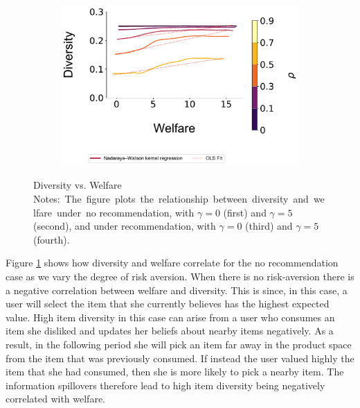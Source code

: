 \documentclass[sigconf]{acmart}
\begin{document}
\begin{figure}[t]
{\begin{minipage}{1.2\textwidth}
\begin{subfigure}{.22\textwidth}
\end{subfigure}
\begin{subfigure}{.22\textwidth}
\includegraphics[width=1.0\linewidth]{figures/diversity_welfare_ra_partial_n_200.pdf}
\end{subfigure}
\end{minipage}}
\caption{Diversity vs. Welfare\hfill\break
\scriptsize{Notes:~The~figure~plots~the~relationship~between~diversity~and~welfare~under~no recommendation, with $\gamma = 0$ (first) and $\gamma = 5$ (second), and under recommendation, with $\gamma = 0$ (third) and $\gamma = 5$ (fourth).}}\label{fig:diversity_welfare_ra}
\end{figure}

Figure \ref{fig:diversity_welfare_ra} shows how diversity and welfare correlate for the no recommendation case as we vary the degree of risk aversion. When there is no risk-aversion there is a negative correlation between welfare and diversity. This is since, in this case, a user will select the item that she currently believes has the highest expected value. High item diversity in this case can arise from a user who consumes an item she disliked and updates her beliefs about nearby items negatively. As a result, in the following period she will pick an item far away in the product space from the item that was previously consumed. If instead the user valued highly the item that she had consumed, then she is more likely to pick a nearby item. The information spillovers therefore lead to high item diversity being negatively correlated with welfare.
\end{document}
